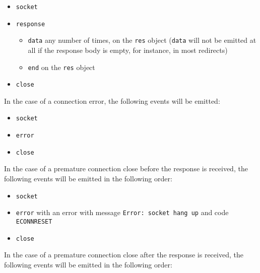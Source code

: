 \begin{itemize}
\tightlist
\item
  \texttt{\textquotesingle{}socket\textquotesingle{}}
\item
  \texttt{\textquotesingle{}response\textquotesingle{}}

  \begin{itemize}
  \tightlist
  \item
    \texttt{\textquotesingle{}data\textquotesingle{}} any number of
    times, on the \texttt{res} object
    (\texttt{\textquotesingle{}data\textquotesingle{}} will not be
    emitted at all if the response body is empty, for instance, in most
    redirects)
  \item
    \texttt{\textquotesingle{}end\textquotesingle{}} on the \texttt{res}
    object
  \end{itemize}
\item
  \texttt{\textquotesingle{}close\textquotesingle{}}
\end{itemize}

In the case of a connection error, the following events will be emitted:

\begin{itemize}
\tightlist
\item
  \texttt{\textquotesingle{}socket\textquotesingle{}}
\item
  \texttt{\textquotesingle{}error\textquotesingle{}}
\item
  \texttt{\textquotesingle{}close\textquotesingle{}}
\end{itemize}

In the case of a premature connection close before the response is
received, the following events will be emitted in the following order:

\begin{itemize}
\tightlist
\item
  \texttt{\textquotesingle{}socket\textquotesingle{}}
\item
  \texttt{\textquotesingle{}error\textquotesingle{}} with an error with
  message
  \texttt{\textquotesingle{}Error:\ socket\ hang\ up\textquotesingle{}}
  and code \texttt{\textquotesingle{}ECONNRESET\textquotesingle{}}
\item
  \texttt{\textquotesingle{}close\textquotesingle{}}
\end{itemize}

In the case of a premature connection close after the response is
received, the following events will be emitted in the following order:

